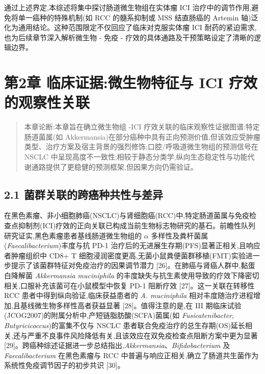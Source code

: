 通过上述界定,本综述将集中探讨肠道微生物组在实体瘤 ICI 治疗中的调节作用,避免将单一癌种的特殊机制(如 RCC 的髓系抑制或 MSS 结直肠癌的 Artemin 轴)泛化为通用结论。这种范围限定不仅回应了临床对克服实体瘤 ICI 耐药的紧迫需求,也为后续章节深入解析微生物 - 免疫 - 疗效的具体通路及干预策略设定了清晰的逻辑边界。

\section{第2章 临床证据:微生物特征与 ICI 疗效的观察性关联}\label{ux7b2c2ux7ae0-ux4e34ux5e8aux8bc1ux636eux5faeux751fux7269ux7279ux5f81ux4e0e-ici-ux7597ux6548ux7684ux89c2ux5bdfux6027ux5173ux8054}

\begin{quote}
本章论断:本章旨在确立微生物组 -ICI 疗效关联的临床观察性证据图谱:特定肠道菌属(如 Akkermansia)在部分癌种中具有正向预测价值,但该效应受肿瘤类型、治疗方案及宿主背景的强烈修饰;口腔/呼吸道微生物组的预测信号在 NSCLC 中呈现高度不一致性;相较于静态分类学,纵向生态稳定性与功能代谢通路提供了更稳健的预测框架,但因果方向仍需验证。
\end{quote}

\subsection{2.1 菌群关联的跨癌种共性与差异}\label{ux83ccux7fa4ux5173ux8054ux7684ux8de8ux764cux79cdux5171ux6027ux4e0eux5deeux5f02}

在黑色素瘤、非小细胞肺癌(NSCLC)与肾细胞癌(RCC)中,特定肠道菌属与免疫检查点抑制剂(ICI)疗效的正向关联已构成当前生物标志物研究的基石。前瞻性队列研究证实,黑色素瘤患者基线肠道微生物组的 \(\alpha\) 多样性及粪杆菌属(\emph{Faecalibacterium})丰度与抗 PD-1 治疗后的无进展生存期(PFS)显著正相关,且响应者肿瘤组织中 CD8+ T 细胞浸润密度更高,无菌小鼠粪便菌群移植(FMT)实验进一步提示了该菌群特征对免疫治疗的因果调节潜力 {[}26{]}。在肺癌与肾癌人群中,黏蛋白降解菌 \emph{Akkermansia muciniphila} 的丰度缺失与抗生素使用导致的疗效下降密切相关,口服补充该菌可在小鼠模型中恢复 PD-1 阻断疗效 {[}27{]}。这一关联在转移性 RCC 患者中得到纵向验证,临床获益患者的 \emph{A. muciniphila} 相对丰度随治疗进程增加,且基线微生物多样性高者获益显著 {[}28{]}。值得注意的是,在 III 期临床试验(JCOG2007)的附属分析中,产短链脂肪酸(SCFA)菌属(如 \emph{Fusicatenibacter}, \emph{Butyricicoccus})的富集不仅与 NSCLC 患者联合免疫治疗的总生存期(OS)延长相关,还与严重不良事件风险降低有关,且该效应在双免疫检查点阻断方案中更为显著 {[}29{]}。跨癌种综述证据进一步总结指出,\emph{Akkermansia}、\emph{Bifidobacterium} 及 \emph{Faecalibacterium} 在黑色素瘤与 RCC 中普遍与响应正相关,确立了肠道共生菌作为系统性免疫调节因子的初步共识 {[}30{]}。

